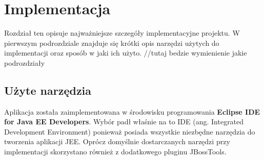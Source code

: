 \chapter{Implementacja}
\label{cha:implementacja}
Rozdział ten opisuje najważniejsze szczegóły implementacyjne projektu. W pierwszym podrozdziale znajduje się krótki opis narzędzi użytych do implementacji oraz sposób w jaki ich użyto.
//tutaj bedzie wymienienie jakie podrozdziały
\section{Użyte narzędzia}
Aplikacja została zaimplementowana w środowisku programowania \textbf{Eclipse IDE for Java EE Developers}. Wybór padł właśnie na to IDE (ang. Integrated Development Environment) ponieważ posiada wszystkie niezbędne narzędzia do tworzenia aplikacji JEE. Oprócz domyślnie dostarczanych narzędzi przy implementacji skorzystano również z dodatkowego pluginu JBossTools.

